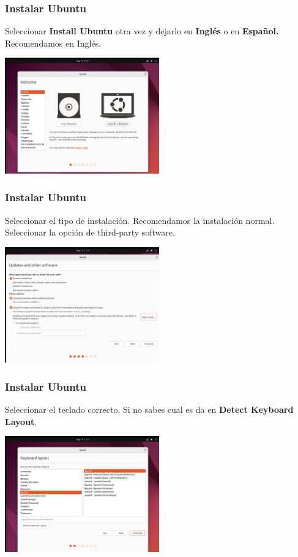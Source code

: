 \documentclass[10pt]{beamer}
\begin{document}
	\begin{frame}
		\frametitle{Instalar Ubuntu}
		Seleccionar \textbf{Install Ubuntu} otra vez y dejarlo en \textbf{Inglés} o en \textbf{Español.} Recomendamos en Inglés.\\
		\begin{center}
			\includegraphics[width=0.5\textwidth]{install2}
		\end{center}
	\end{frame}
	
	\begin{frame}
		\frametitle{Instalar Ubuntu}
		Seleccionar el tipo de instalación. Recomendamos la instalación normal.\\
		Seleccionar la opción de third-party software.\\
		
		
		\begin{center}
			\includegraphics[width=0.5\textwidth]{installation}
		\end{center}
	\end{frame}
	
	\begin{frame}
		\frametitle{Instalar Ubuntu}
		Seleccionar el teclado correcto. Si no sabes cual es da en \textbf{Detect Keyboard Layout}.\\
		
		
		\begin{center}
			\includegraphics[width=0.5\textwidth]{keyboard}
		\end{center}
	\end{frame}
	
\end{document}
